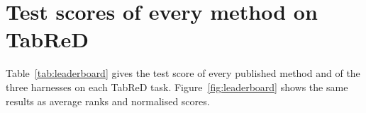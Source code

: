\section{Test scores of every method on TabReD}
\label{app:raw}

Table~\ref{tab:leaderboard} gives the test score of every published method and
of the three harnesses on each TabReD task. Figure~\ref{fig:leaderboard} shows
the same results as average ranks and normalised scores.


